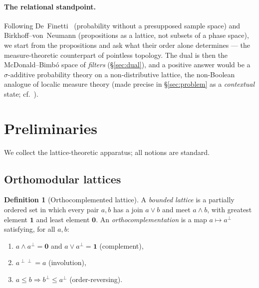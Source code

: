 \documentclass[11pt,reqno]{amsart}
\theoremstyle{plain}
\theoremstyle{definition}
\newtheorem{definition}[theorem]{Definition}
\theoremstyle{remark}
\begin{document}
\paragraph{The relational standpoint.} Following De~Finetti~\cite{deFinetti1974}
(probability without a presupposed sample space) and Birkhoff--von~Neumann
(propositions as a lattice, not subsets of a phase space), we start from the
propositions and ask what their order alone determines --- the measure-theoretic
counterpart of pointless topology. The dual is then the McDonald--Bimb\'{o} space of
\emph{filters} (\S\ref{sec:dual}), and a positive answer would be a $\sigma$-additive
probability theory on a non-distributive lattice, the non-Boolean analogue of localic
measure theory (made precise in \S\ref{sec:problem} as a \emph{contextual} state;
cf.~\cite{mahon2025}).

\section{Preliminaries}
\label{sec:prelim}

We collect the lattice-theoretic apparatus; all notions are standard.

\subsection{Orthomodular lattices}
\label{sec:oml}

\begin{definition}[Orthocomplemented lattice]\label{def:ocl}
A \emph{bounded lattice} is a partially ordered set in which every pair
$a,b$ has a join $a \vee b$ and meet $a \wedge b$, with greatest element
$\mathbf 1$ and least element $\mathbf 0$. An \emph{orthocomplementation}
is a map $a \mapsto a^\perp$ satisfying, for all $a,b$:
\begin{enumerate}[label=(\roman*), noitemsep]
  \item $a \wedge a^\perp = \mathbf 0$ and $a \vee a^\perp = \mathbf 1$
    (complement),
  \item $a^{\perp\perp} = a$ (involution),
  \item $a \leq b \Rightarrow b^\perp \leq a^\perp$ (order-reversing).
\end{enumerate}
\end{definition}
\end{document}

